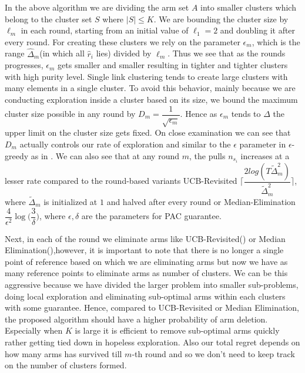 In the above algorithm we are dividing the arm set $A$ into smaller clusters which belong to the cluster set $S$ where $|S|\leq K$. We are bounding the cluster size by $\ell_{m}$ in each round, starting from an initial value of $\ell_{1}=2$ and doubling it after every round. For creating these clusters we rely on the parameter $\epsilon_{m}$, which is the range $\hat{\Delta}_{m}$(in which all $\hat{r}_{i}$ lies) divided by $\ell_{m}$. 
Thus we see that as the rounds progresses, $\epsilon_{m}$ gets smaller and smaller resulting in tighter and tighter clusters with high purity level. Single link clustering tends to create large clusters with many elements in a single cluster. To avoid this behavior, mainly because we are conducting exploration inside a cluster based on its size, we bound the maximum cluster size possible in any round by $D_{m}=\dfrac{1}{\sqrt{\epsilon_{m}}}$. Hence as $\epsilon_{m}$ tends to $\Delta$ the upper limit on the cluster size gets fixed. On close examination we can see that $D_{m}$ actually controls our rate of exploration and similar to the $\epsilon$ parameter in $\epsilon$-greedy as in \cite{sutton1998reinforcement}. We can also see that at any round $m$, the pulls $n_{s_{i}}$ increases at a lesser rate compared to the round-based variants UCB-Revisited $\bigg\lceil \dfrac{2log(T\tilde{\Delta}_{m}^{2})}{\tilde{\Delta}_{m}^{2}} \bigg\rceil$, where $\tilde{\Delta}_{m}$ is initialized at $1$ and halved after every round or Median-Elimination $\dfrac{4}{\epsilon^{2}}\log\big(\dfrac{3}{\delta}\big)$, where $\epsilon,\delta$ are the parameters for PAC guarantee.

	Next, in each of the round we eliminate arms like UCB-Revisited(\cite{auer2010ucb}) or Median Elimination(\cite{even2006action}),however, it is important to note that there is no longer a single point of reference based on which we are eliminating arms but now we have as many reference points to eliminate arms as number of clusters. We can be this aggressive because we have divided the larger problem into smaller sub-problems, doing local exploration and eliminating sub-optimal arms within each clusters with some guarantee. Hence, compared to UCB-Revisited or Median Elimination, the proposed algorithm should have a higher probability of arm deletion. Especially when $K$ is large it is efficient to remove sub-optimal arms quickly rather getting tied down in hopeless exploration. Also our total regret depends on how many arms has survived till $m$-th round and so we don't need to keep track on the number of clusters formed.

